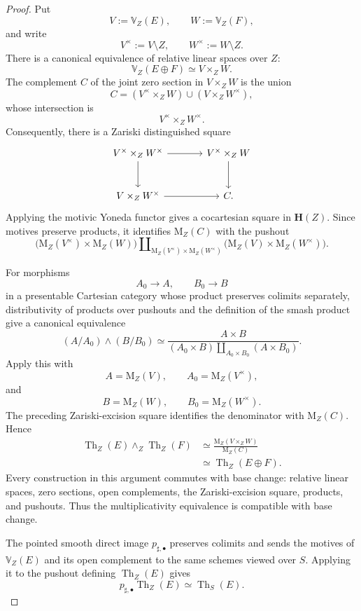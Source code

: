 \begin{proof}
Put
\[
    V
    :=
    \mathbb V_Z(E),
    \qquad
    W
    :=
    \mathbb V_Z(F),
\]
and write
\[
    V^\times
    :=
    V\setminus Z,
    \qquad
    W^\times
    :=
    W\setminus Z.
\]
There is a canonical equivalence of relative linear spaces over \(Z\):
\[
    \mathbb V_Z(E\oplus F)
    \simeq
    V\times_ZW.
\]
The complement \(C\) of the joint zero section in \(V\times_ZW\) is
the union
\[
    C
    =
    (V^\times\times_ZW)
    \cup
    (V\times_ZW^\times),
\]
whose intersection is
\[
    V^\times\times_ZW^\times.
\]
Consequently, there is a Zariski distinguished square
\[
\begin{tikzcd}[column sep=large, row sep=large]
    V^\times\times_ZW^\times
        \arrow[r]
        \arrow[d]
    &
    V^\times\times_ZW
        \arrow[d]
    \\
    V\times_ZW^\times
        \arrow[r]
    &
    C.
\end{tikzcd}
\]
Applying the motivic Yoneda functor gives a cocartesian square in
\(\mathbf H(Z)\).  Since motives preserve products, it identifies
\(\mathrm M_Z(C)\) with the pushout
\[
    \bigl(
        \mathrm M_Z(V^\times)
        \times
        \mathrm M_Z(W)
    \bigr)
    \amalg_{
        \mathrm M_Z(V^\times)
        \times
        \mathrm M_Z(W^\times)
    }
    \bigl(
        \mathrm M_Z(V)
        \times
        \mathrm M_Z(W^\times)
    \bigr).
\]

For morphisms
\[
    A_0
    \longrightarrow
    A,
    \qquad
    B_0
    \longrightarrow
    B
\]
in a presentable Cartesian category whose product preserves colimits
separately, distributivity of products over pushouts and the definition
of the smash product give a canonical equivalence
\[
    (A/A_0)
    \wedge
    (B/B_0)
    \simeq
    \frac{A\times B}{
        (A_0\times B)
        \amalg_{A_0\times B_0}
        (A\times B_0)
    }.
\]
Apply this with
\[
    A
    =
    \mathrm M_Z(V),
    \qquad
    A_0
    =
    \mathrm M_Z(V^\times),
\]
and
\[
    B
    =
    \mathrm M_Z(W),
    \qquad
    B_0
    =
    \mathrm M_Z(W^\times).
\]
The preceding Zariski-excision square identifies the denominator with
\(\mathrm M_Z(C)\).  Hence
\[
\begin{aligned}
    \operatorname{Th}_Z(E)
    \wedge_Z
    \operatorname{Th}_Z(F)
    &\simeq
    \frac{
        \mathrm M_Z(V\times_ZW)
    }{
        \mathrm M_Z(C)
    }
    \\
    &\simeq
    \operatorname{Th}_Z(E\oplus F).
\end{aligned}
\]
Every construction in this argument commutes with base change: relative
linear spaces, zero sections, open complements, the Zariski-excision
square, products, and pushouts.  Thus the multiplicativity equivalence
is compatible with base change.

The pointed smooth direct image \(p_{\sharp,\bullet}\) preserves
colimits and sends the motives of \(\mathbb V_Z(E)\) and its open
complement to the same schemes viewed over \(S\).  Applying it to the
pushout defining \(\operatorname{Th}_Z(E)\) gives
\[
    p_{\sharp,\bullet}\operatorname{Th}_Z(E)
    \simeq
    \operatorname{Th}_S(E).
\]
\end{proof}

